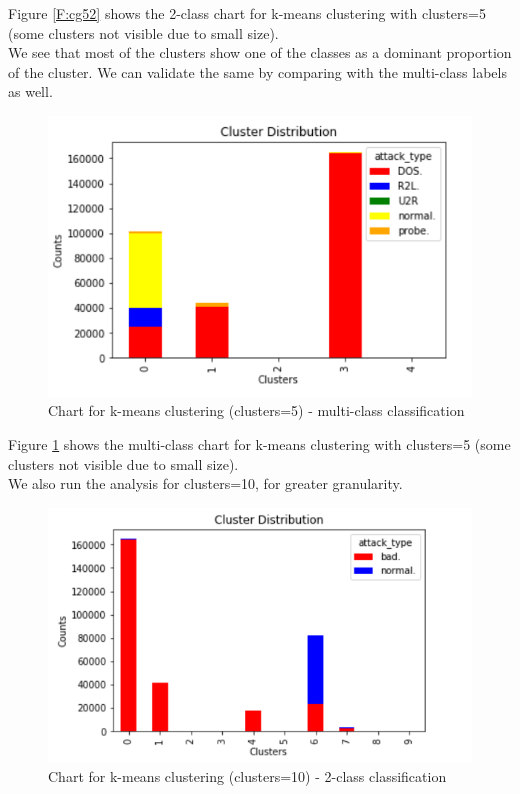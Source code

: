 Figure \ref{F:cg52} shows the 2-class chart for k-means clustering with clusters=5 (some clusters not visible due to small size).\\
We see that most of the clusters show one of the classes as a dominant proportion of the cluster. We can validate the same by comparing with the multi-class labels as well.\\
\begin{figure}
	\includegraphics[width=1.0\columnwidth]{images/cluster5allgraph.PNG}
	\caption{Chart for k-means clustering (clusters=5) - multi-class classification}
	\label{F:cg5all}
\end{figure}
Figure \ref{F:cg5all} shows the multi-class chart for k-means clustering with clusters=5 (some clusters not visible due to small size).\\
We also run the analysis for clusters=10, for greater granularity.
\begin{figure}
	\includegraphics[width=1.0\columnwidth]{images/cluster102graph.PNG}
	\caption{Chart for k-means clustering (clusters=10) - 2-class classification}
	\label{F:cg102}
\end{figure}
